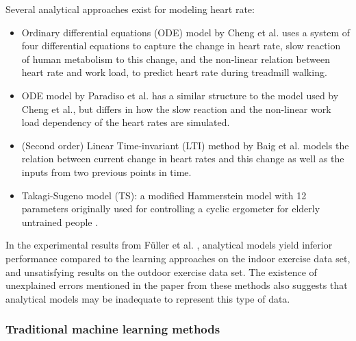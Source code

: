 \documentclass[12pt]{article}
\begin{document}
        Several analytical approaches exist for modeling heart rate:
        \begin{itemize}[label={--}]
            \item Ordinary differential equations (ODE) model by Cheng et al. \cite{Cheng08NonlinearModelHeartRate} uses a system of four differential equations to capture the change in heart rate, slow reaction of human metabolism to this change, and the non-linear relation between heart rate and work load, to predict heart rate during treadmill walking.

            \item ODE model by Paradiso et al. \cite{paradiso13heartregulation} has a similar structure to the model used by Cheng et al., but differs in how the slow reaction and the non-linear work load dependency of the heart rates are simulated.

            \item (Second order) Linear Time-invariant (LTI) method by Baig et al. \cite{Baig10ModelHeart} models the relation between current change in heart rates and this change as well as the inputs from two previous points in time.

            \item Takagi-Sugeno model (TS): a modified Hammerstein model with 12 parameters originally used for controlling a cyclic ergometer for elderly untrained people \cite{Mohammad2013821}.

            \end{itemize}

        In the experimental results from F{\"u}ller et al. \cite{Fueller15}, analytical models yield inferior performance compared to the learning approaches on the indoor exercise data set, and unsatisfying results on the outdoor exercise data set. The existence of unexplained errors mentioned in the paper from these methods also suggests that analytical models may be inadequate to represent this type of data.

        \subsubsection{Traditional machine learning methods}
\end{document}
